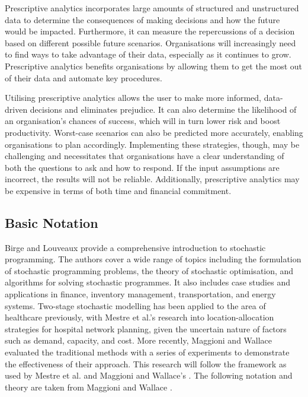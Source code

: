 \documentclass[../thesis.tex]{subfiles}
\begin{document}
Prescriptive analytics incorporates large amounts of structured and unstructured data to determine the consequences of making decisions and how the future would be impacted. Furthermore, it can measure the repercussions of a decision based on different possible future scenarios. Organisations will increasingly need to find ways to take advantage of their data, especially as it continues to grow. Prescriptive analytics benefits organisations by allowing them to get the most out of their data and automate key procedures.

Utilising prescriptive analytics allows the user to make more informed, data-driven decisions and eliminates prejudice. It can also determine the likelihood of an organisation's chances of success, which will in turn lower risk and boost productivity. Worst-case scenarios can also be predicted more accurately, enabling organisations to plan accordingly. Implementing these strategies, though, may be challenging and necessitates that organisations have a clear understanding of both the questions to ask and how to respond. If the input assumptions are incorrect, the results will not be reliable. Additionally, prescriptive analytics may be expensive in terms of both time and financial commitment.


\subsection{Basic Notation}
Birge and Louveaux \cite{Birge2011} provide a comprehensive introduction to stochastic programming. The authors cover a wide range of topics including the formulation of stochastic programming problems, the theory of stochastic optimisation, and algorithms for solving stochastic programmes. It also includes case studies and applications in finance, inventory management, transportation, and energy systems. Two-stage stochastic modelling has been applied to the area of healthcare previously, with Mestre et al.'s \cite{Mestre2015} research into location-allocation strategies for hospital network planning, given the uncertain nature of factors such as demand, capacity, and cost. More recently, Maggioni and Wallace \cite{Maggioni2010} evaluated the traditional methods with a series of experiments to demonstrate the effectiveness of their approach. This research will follow the framework as used by Mestre et al. \cite{Mestre2015} and Maggioni and Wallace's \cite{Maggioni2010}. The following notation and theory are taken from Maggioni and Wallace \cite{Maggioni2010}.
\end{document}
